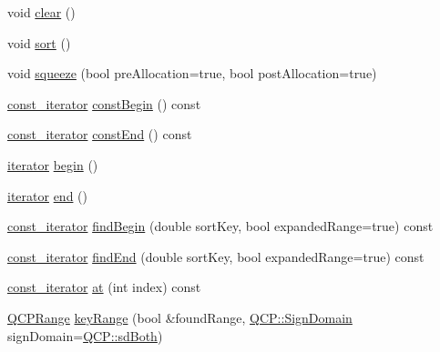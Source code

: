 \begin{DoxyCompactItemize}
\item 
void \hyperlink{class_q_c_p_data_container_a7e2b29736c6fd761649bda1a54ba967f}{clear} ()
\item 
void \hyperlink{class_q_c_p_data_container_a75da92e33063b63d6da5014683591d45}{sort} ()
\item 
void \hyperlink{class_q_c_p_data_container_a82fcc511def22287fc62579d0706387c}{squeeze} (bool pre\+Allocation=true, bool post\+Allocation=true)
\item 
\hyperlink{class_q_c_p_data_container_ae40a91f5cb0bcac61d727427449b7d15}{const\+\_\+iterator} \hyperlink{class_q_c_p_data_container_a49d7622999e2de67fa2331626a3159aa}{const\+Begin} () const
\item 
\hyperlink{class_q_c_p_data_container_ae40a91f5cb0bcac61d727427449b7d15}{const\+\_\+iterator} \hyperlink{class_q_c_p_data_container_aa7f7cf239b85b1a28de3d675cc5b3da1}{const\+End} () const
\item 
\hyperlink{class_q_c_p_data_container_a1bb453c3ae37d1ee5268878acb3a9d29}{iterator} \hyperlink{class_q_c_p_data_container_a80032518413ab8f418f7c81182fd06cb}{begin} ()
\item 
\hyperlink{class_q_c_p_data_container_a1bb453c3ae37d1ee5268878acb3a9d29}{iterator} \hyperlink{class_q_c_p_data_container_acf66dfad83fe041380f5e0491e7676f2}{end} ()
\item 
\hyperlink{class_q_c_p_data_container_ae40a91f5cb0bcac61d727427449b7d15}{const\+\_\+iterator} \hyperlink{class_q_c_p_data_container_a2ad8a5399072d99a242d3a6d2d7e278a}{find\+Begin} (double sort\+Key, bool expanded\+Range=true) const
\item 
\hyperlink{class_q_c_p_data_container_ae40a91f5cb0bcac61d727427449b7d15}{const\+\_\+iterator} \hyperlink{class_q_c_p_data_container_afb8b8f23cc2b7234a793a25ce79fe48f}{find\+End} (double sort\+Key, bool expanded\+Range=true) const
\item 
\hyperlink{class_q_c_p_data_container_ae40a91f5cb0bcac61d727427449b7d15}{const\+\_\+iterator} \hyperlink{class_q_c_p_data_container_ae90c7457a052b223539906e6bddc0a92}{at} (int index) const
\item 
\hyperlink{class_q_c_p_range}{Q\+C\+P\+Range} \hyperlink{class_q_c_p_data_container_aba6e1a93c21ccc56a432b4a02c9d0ed2}{key\+Range} (bool \&found\+Range, \hyperlink{namespace_q_c_p_afd50e7cf431af385614987d8553ff8a9}{Q\+C\+P\+::\+Sign\+Domain} sign\+Domain=\hyperlink{namespace_q_c_p_afd50e7cf431af385614987d8553ff8a9aa38352ef02d51ddfa4399d9551566e24}{Q\+C\+P\+::sd\+Both})
\item 

\end{DoxyCompactItemize}

